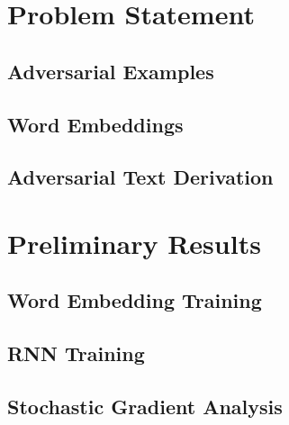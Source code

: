 \chapter{Problem Statement}
\section{Adversarial Examples}

\section{Word Embeddings}\label{sec:word_embeddings}

\section{Adversarial Text Derivation}


\chapter{Preliminary Results}
\section{Word Embedding Training}

\section{RNN Training}

\section{Stochastic Gradient Analysis}\label{sec:stochastic_gradient_analysis}

